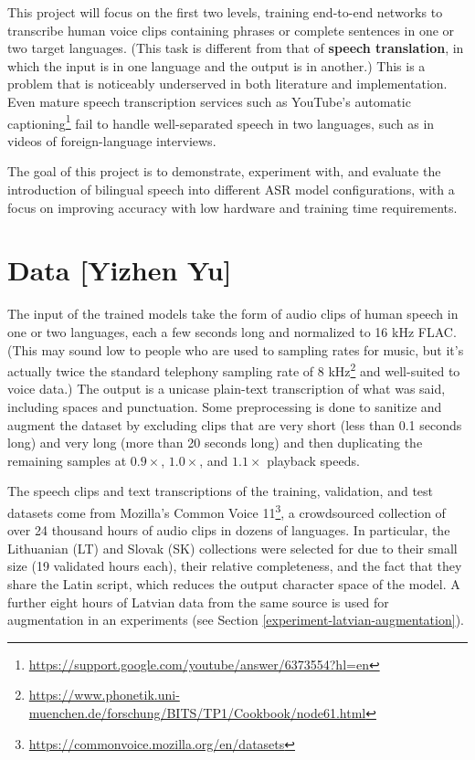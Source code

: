 \documentclass{article}
\begin{document}
  This project will focus on the first two levels, training end-to-end networks to transcribe human voice clips containing phrases or complete sentences in one or two target languages. (This task is different from that of \textbf{speech translation}, in which the input is in one language and the output is in another.) This is a problem that is noticeably underserved in both literature and implementation. Even mature speech transcription services such as YouTube's automatic captioning\footnote{\url{https://support.google.com/youtube/answer/6373554?hl=en}} fail to handle well-separated speech in two languages, such as in videos of foreign-language interviews.

  The goal of this project is to demonstrate, experiment with, and evaluate the introduction of bilingual speech into different ASR model configurations, with a focus on improving accuracy with low hardware and training time requirements.
  \section{Data [Yizhen Yu]} \label{data}
  The input of the trained models take the form of audio clips of human speech in one or two languages, each a few seconds long and normalized to 16 kHz FLAC. (This may sound low to people who are used to sampling rates for music, but it's actually twice the standard telephony sampling rate of 8 kHz\footnote{\url{https://www.phonetik.uni-muenchen.de/forschung/BITS/TP1/Cookbook/node61.html}} and well-suited to voice data.) The output is a unicase plain-text transcription of what was said, including spaces and punctuation. Some preprocessing is done to sanitize and augment the dataset by excluding clips that are very short (less than 0.1 seconds long) and very long (more than 20 seconds long) and then duplicating the remaining samples at $0.9 \times$, $1.0 \times$, and $1.1 \times$ playback speeds.

  The speech clips and text transcriptions of the training, validation, and test datasets come from Mozilla's Common Voice 11\footnote{\url{https://commonvoice.mozilla.org/en/datasets}}, a crowdsourced collection of over 24 thousand hours of audio clips in dozens of languages. In particular, the Lithuanian (LT) and Slovak (SK) collections were selected for due to their small size (19 validated hours each), their relative completeness, and the fact that they share the Latin script, which reduces the output character space of the model. A further eight hours of Latvian data from the same source is used for augmentation in an experiments (see Section \ref{experiment-latvian-augmentation}).
\end{document}
